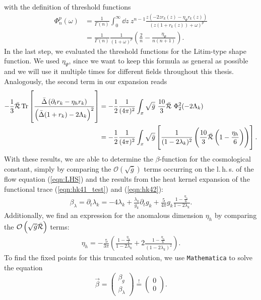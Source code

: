 with the definition of threshold functions 
\begin{equation}
\begin{aligned}
	\Phi_n^p(\omega) &= \frac{1}{\Gamma(n)}\int_0^{\infty}\dd z \ z^{n-1} \frac{z(-2zr_k(z)-\eta_{\Psi}r_k(z))}{(z(1+r_k(z))+\omega)^p}\\[10pt] 
	&= \frac{1}{\Gamma(n)}\frac{1}{\left(1+\omega\right)^p}\left(\frac{2}{n} - \frac{\eta_{\Psi}}{n(n+1)}\right).
\end{aligned}
\label{eqn:threshold}
\end{equation}
In the last step, we evaluated the threshold functions for the Litim-type shape function. We used $\eta_\Psi$, since we want to keep this formula as general as possible and we will use it multiple times for different fields throughout this thesis. Analogously, the second term in our expansion reads
\begin{align}
	-\frac{1}{3}\bar{\mathcal{R}}\operatorname{Tr}\left[\frac{\bar{\Delta}\left(\partial_t r_k - \eta_h r_k\right)}{\left(\bar{\Delta}(1+r_k)-2\Lambda_k\right)^2}\right] &= -\frac{1}{2}\frac{1}{(4\pi)^2}\int_x \sqrt{\bar{g}} \ \frac{10}{3}\bar{\Ricci}\ \Phi_2^2(-2\Lambda_k)\\
	&=  -\frac{1}{2}\frac{1}{(4\pi)^2}\int_x \sqrt{\bar{g}}\left[\frac{1}{(1-2\lambda_k)^2}\left( \frac{10}{3}\bar{\Ricci}\left(1-\frac{\eta_h}{6}\right)\right)\right].\nonumber
	\label{eqn:hk42}
\end{align}
With these results, we are able to determine the $\beta$-function for the cosmological constant, simply by comparing the $\mathcal{O}\left(\sqrt{\bar{g}}\right)$ terms occurring on the l.\,h.\,s. of the flow equation (\ref{eqn:LHS}) and the results from the heat kernel expansion of the functional trace (\ref{eqn:hk41_test}) and (\ref{eqn:hk42}):
\begin{align}
	\beta_{\lambda} = \partial_t\lambda_k = -4\lambda_k + \frac{\lambda_k}{g_k} \partial_t g_k + \frac{5}{4\pi}g_k\frac{1-\frac{\eta_h}{6}}{1-2\lambda_k}.
\end{align}
Additionally, we find an expression for the anomalous dimension $\eta_h$ by comparing the $\mathcal{O}\left(\sqrt{\bar{g}}\bar{\mathcal{R}}\right)$ terms:
\begin{align}
\eta_h = -\frac{5}{3\pi} \left(\frac{1-\frac{\eta_h}{4}}{1-2\lambda_k} + 2\frac{1-\frac{\eta_h}{6}}{(1-2\lambda_k)^2}\right).	
\end{align}
To find the fixed points for this truncated solution, we use \verb|Mathematica| to solve the equation
\begin{equation}
	\vec{\beta} = \begin{pmatrix}\beta_g\\ \beta_{\lambda}\end{pmatrix} \overset{!}{=}  \begin{pmatrix}0\\ 0\end{pmatrix}.
\end{equation}
